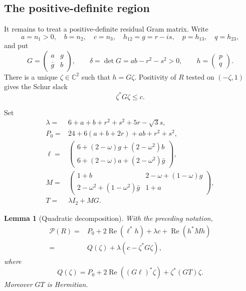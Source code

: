 \documentclass[11pt]{article}
\newtheorem{lemma}[theorem]{Lemma}
\theoremstyle{definition}
\newcommand{\CC}{\mathbb C}
\newcommand{\Rea}{\operatorname{Re}}
\newcommand{\mat}[1]{\begin{pmatrix}#1\end{pmatrix}}
\begin{document}
\subsection{The positive-definite region}

It remains to treat a positive-definite residual Gram matrix.  Write
\begin{equation}\label{eq:G-data}
 a=n_1>0,\quad b=n_2,\quad c=n_3,\quad
 h_{12}=g=r-is,\quad p=h_{13},\quad q=h_{23},
\end{equation}
and put
\begin{equation}\label{eq:Gram-G-delta}
 G=\mat{a&g\\\bar g&b},\qquad
 \delta=\det G=ab-r^2-s^2>0,\qquad h=\mat{p\\q}.
\end{equation}
There is a unique $\zeta\in\CC^2$ such that $h=G\zeta$.  Positivity of
$R$ tested on $(-\zeta,1)$ gives the Schur slack
\begin{equation}\label{eq:schur-slack}
 \zeta^*G\zeta\leq c.
\end{equation}

Set
\begin{align}
 \lambda={}&6+a+b+r^2+s^2+5r-\sqrt3s,\label{eq:lambda}\\
 P_0={}&24+6(a+b+2r)+ab+r^2+s^2,\label{eq:P0}\\
 \ell={}&\mat{
 6+(2-\omega)g+(2-\omega^2)b\\
 6+(2-\omega)a+(2-\omega^2)\bar g},\label{eq:ell}\\
 M={}&\mat{
 1+b&2-\omega+(1-\omega)g\\
 2-\omega^2+(1-\omega^2)\bar g&1+a},\label{eq:M}\\
 T={}&\lambda I_2+MG.\label{eq:Tmatrix}
\end{align}

\begin{lemma}[Quadratic decomposition]\label{lem:quadratic-decomposition}
With the preceding notation,
\begin{align}
 \mathcal P(R)
 ={}&P_0+2\Rea(\ell^*h)+\lambda c+\Rea(h^*Mh)\label{eq:P-quadratic}\\
 ={}&Q(\zeta)+\lambda(c-\zeta^*G\zeta),\nonumber
\end{align}
where
\begin{equation}\label{eq:Qzeta}
 Q(\zeta)=P_0+2\Rea((G\ell)^*\zeta)+\zeta^*(GT)\zeta.
\end{equation}
Moreover $GT$ is Hermitian.
\end{lemma}
\end{document}
